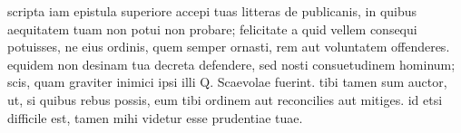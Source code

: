  scripta iam epistula superiore accepi tuas litteras de publicanis, in quibus aequitatem tuam non potui non probare; felicitate a quid vellem consequi potuisses, ne eius ordinis, quem semper ornasti, rem aut voluntatem offenderes. equidem non desinam tua decreta defendere, sed nosti consuetudinem hominum; scis, quam graviter inimici ipsi illi Q. Scaevolae fuerint. tibi tamen sum auctor, ut, si quibus rebus possis, eum tibi ordinem aut reconcilies aut mitiges. id etsi difficile est, tamen mihi videtur esse prudentiae tuae.
